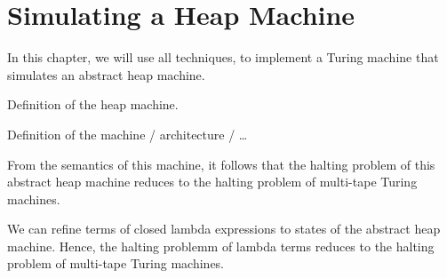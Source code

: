 \chapter{Simulating a Heap Machine}
\label{chap:heap}



In this chapter, we will use all techniques, to implement a Turing machine that simulates an abstract heap machine.

Definition of the heap machine.

Definition of the machine / architecture / \dots

From the semantics of this machine, it follows that the halting problem of this abstract heap machine reduces to the halting problem of multi-tape Turing machines.

We can refine terms of closed lambda expressions to states of the abstract heap machine.
Hence, the halting problemm of lambda terms reduces to the halting problem of multi-tape Turing machines.

